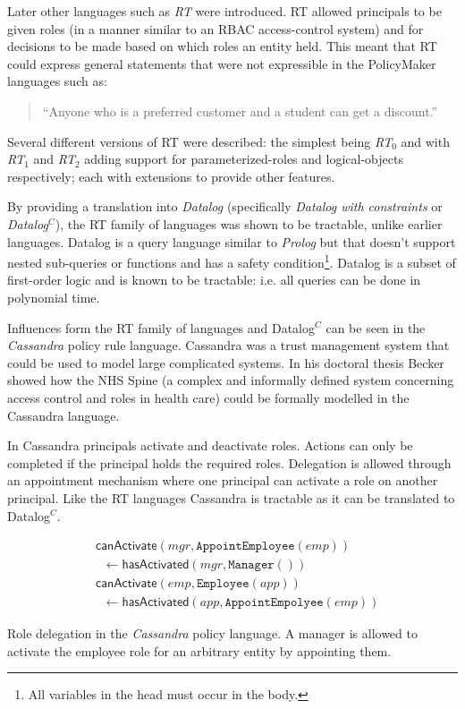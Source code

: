 \documentclass[a4paper]{article}
\begin{document}
Later other languages such as \emph{RT}\cite{Li:2002if} were introduced. RT
allowed principals to be given roles (in a manner similar to an \ac{RBAC}
access-control system) and for decisions to be made based on which roles an
entity held. This meant that RT could express general statements that were not
expressible in the PolicyMaker languages such as:
\begin{quote}
  ``Anyone who is a preferred customer and a student can get a discount.''
\end{quote}
Several different versions of RT were described: the simplest being
\emph{RT$_0$}\cite{Li:2003tj} and with \emph{RT$_1$} and \emph{RT$_2$} adding support for
parameterized-roles and logical-objects respectively; each with extensions to
provide other features.

By providing a translation into \emph{Datalog} (specifically \emph{Datalog with
  constraints} or \emph{Datalog$^C$\cite{Li:2003ix}}), the RT family of
languages was shown to be tractable, unlike earlier languages. Datalog is a
query language similar to \emph{Prolog} but that doesn't support nested
sub-queries or functions and has a safety condition\footnote{All variables in
  the head must occur in the body.}. Datalog is a subset of first-order logic
and is known to be tractable: i{.}e{.} all queries can be done in polynomial
time.

Influences form the RT family of languages and Datalog$^C$ can be seen in the
\emph{Cassandra} policy rule language\cite{Becker:2004fi}. Cassandra was a
trust management system that could be used to model large complicated systems.
In his doctoral thesis Becker showed how the NHS Spine (a complex and informally
defined system concerning access control and roles in health care) could be
formally modelled in the Cassandra language.

In Cassandra principals activate and deactivate roles. Actions can only be completed if the
principal holds the required roles. Delegation is allowed through an
appointment mechanism where one principal can activate a role on another
principal. Like the RT languages Cassandra is tractable as it can be translated
to Datalog$^C$.

\begin{marginfigure}\label{code:cassandra}
  \begin{align*}
    &\textsf{canActivate}(mgr, \texttt{AppointEmployee}(emp)) \\
    &\;\;\gets \textsf{hasActivated}(mgr, \texttt{Manager}()) \\
    &\textsf{canActivate}(emp, \texttt{Employee}(app)) \\
    &\;\;\gets \textsf{hasActivated}(app, \texttt{AppointEmpolyee}(emp))
  \end{align*}
  \caption{Role delegation in the \emph{Cassandra} policy language. A manager is
  allowed to activate the employee role for an arbitrary entity by appointing
  them.}
\end{marginfigure}
\end{document}
